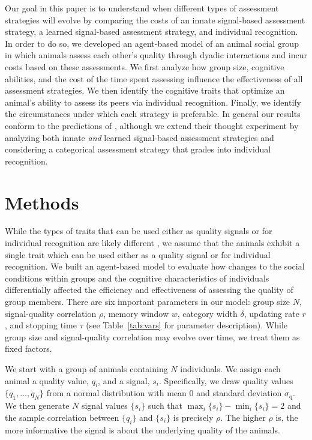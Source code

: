 Our goal in this paper is to understand when different types of assessment strategies will evolve by comparing the costs of an innate signal-based assessment strategy, a learned signal-based assessment strategy, and individual recognition.  In order to do so, we developed an agent-based model of an animal social group in which animals assess each other's quality through dyadic interactions and incur costs based on these assessments. We first analyze how group size, cognitive abilities, and the cost of the time spent assessing influence the effectiveness of all assessment strategies. We then identify the cognitive traits that optimize an animal's ability to assess its peers via individual recognition. Finally, we identify the circumstances under which each strategy is preferable. In general our results conform to the predictions of \citet{sheehan2016evotradeoff}, although we extend their thought experiment by analyzing both innate \emph{and} learned signal-based assessment strategies and considering a categorical assessment strategy that grades into individual recognition. 


\section*{Methods} 
While the types of traits that can be used either as quality signals or for individual recognition are likely different \citep{Dale:2001dv}, we assume that the animals exhibit a single trait which can be used either as a quality signal or for individual recognition.
We built an agent-based model to evaluate how changes to the social conditions within groups and the cognitive characteristics of individuals differentially affected the efficiency and effectiveness of assessing the quality of group members. There are six important parameters in our model: group size $N$, signal-quality correlation $\rho$, memory window $w$, category width $\delta$, updating rate $r$, and stopping time $\tau$ (see Table~\ref{tab:vars} for parameter description). While group size and signal-quality correlation may evolve over time, we treat them as fixed factors. 

We start with a group of animals containing $N$ individuals. We assign each animal a quality value, $q_i$, and a signal, $s_i$. Specifically, we draw quality values $\{q_1,\dots,q_N\}$ from a normal distribution with mean $0$ and standard deviation $\sigma_\text{q}$. We then generate $N$ signal values $\{s_i\}$ such that 
$\max_i\{s_i\}-\min_i\{s_i\}=2$ and the sample correlation between $\{q_i\}$ and $\{s_i\}$ is precisely $\rho$. 
The higher $\rho$ is, the more informative the signal is about the underlying quality of the animals.

